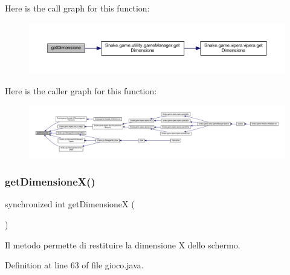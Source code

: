 Here is the call graph for this function\+:
\nopagebreak
\begin{figure}[H]
\begin{center}
\leavevmode
\includegraphics[width=350pt]{class_snake_1_1game_1_1gioco_af0072e81eee8ca6f1aadbda23fa837c7_cgraph}
\end{center}
\end{figure}
Here is the caller graph for this function\+:
\nopagebreak
\begin{figure}[H]
\begin{center}
\leavevmode
\includegraphics[width=350pt]{class_snake_1_1game_1_1gioco_af0072e81eee8ca6f1aadbda23fa837c7_icgraph}
\end{center}
\end{figure}
\mbox{\label{class_snake_1_1game_1_1gioco_ad74e7d47d7a1a055b993ccebbc684c08}} 
\subsubsection{\texorpdfstring{get\+Dimensione\+X()}{getDimensioneX()}}
{\footnotesize\ttfamily synchronized int get\+DimensioneX (\begin{DoxyParamCaption}{ }\end{DoxyParamCaption})}



Il metodo permette di restituire la dimensione X dello schermo. 



Definition at line 63 of file gioco.\+java.

